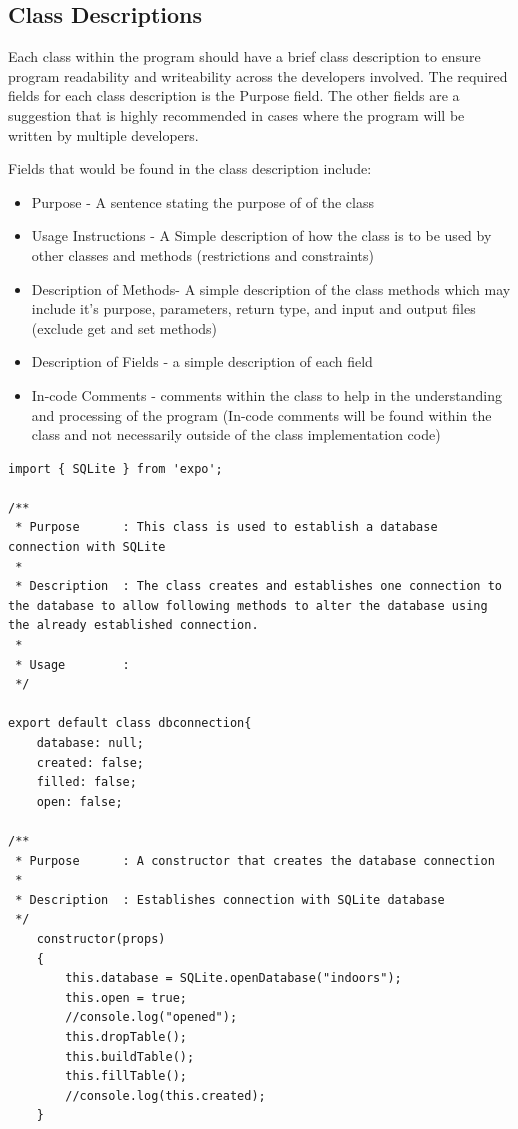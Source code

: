 \documentclass{article}
\begin{document}
\subsection{Class Descriptions}

Each class within the program should have a brief class description to ensure program readability and writeability across the developers involved. The required fields for each class description is the Purpose field. The other fields are a suggestion that is highly recommended in cases where the program will be written by multiple developers. \cite{kung}

Fields that would be found in the class description include:

\begin{itemize}
\item Purpose - A sentence stating the purpose of of the class
\item Usage Instructions - A Simple description of how the class is to be used by other classes and methods (restrictions and constraints)
\item Description of Methods- A simple description of the class methods which may include it's purpose, parameters, return type, and input and output files (exclude get and set methods)
\item Description of Fields - a simple description of each field
\item In-code Comments - comments within the class to help in the understanding and processing of the program (In-code comments will be found within the class and not necessarily outside of the class implementation code)

\end{itemize}

\begin{lstlisting}
import { SQLite } from 'expo';

/**
 * Purpose		: This class is used to establish a database connection with SQLite
 * 
 * Description	: The class creates and establishes one connection to the database to allow following methods to alter the database using the already established connection.
 * 
 * Usage        :       
 */

export default class dbconnection{
	database: null;
	created: false;
	filled: false;
	open: false;

/**
 * Purpose		: A constructor that creates the database connection
 * 
 * Description	: Establishes connection with SQLite database
 */
	constructor(props)
	{
		this.database = SQLite.openDatabase("indoors");
		this.open = true;
		//console.log("opened");
		this.dropTable();
		this.buildTable();
		this.fillTable();
		//console.log(this.created);
	}

\end{lstlisting}
\end{document}
